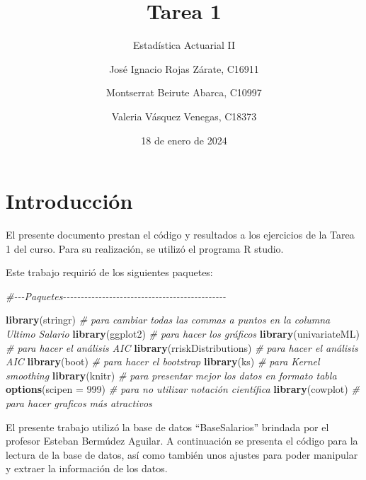 \documentclass[
]{article}
\title{Tarea 1}
\subtitle{Estadística Actuarial II}
\author{José Ignacio Rojas Zárate, C16911 \and Montserrat Beirute
Abarca, C10997 \and Valeria Vásquez Venegas, C18373}
\date{18 de enero de 2024}
\newenvironment{Shaded}{\begin{snugshade}}{\end{snugshade}}
\newcommand{\AttributeTok}[1]{\textcolor[rgb]{0.13,0.29,0.53}{#1}}
\newcommand{\CommentTok}[1]{\textcolor[rgb]{0.56,0.35,0.01}{\textit{#1}}}
\newcommand{\DecValTok}[1]{\textcolor[rgb]{0.00,0.00,0.81}{#1}}
\newcommand{\FunctionTok}[1]{\textcolor[rgb]{0.13,0.29,0.53}{\textbf{#1}}}
\newcommand{\NormalTok}[1]{#1}
\begin{document}
\maketitle

{
\setcounter{tocdepth}{2}
\tableofcontents
}
\newpage

\hypertarget{introducciuxf3n}{%
\section{Introducción}\label{introducciuxf3n}}

El presente documento prestan el código y resultados a los ejercicios de
la Tarea 1 del curso. Para su realización, se utilizó el programa R
studio.

Este trabajo requirió de los siguientes paquetes:

\begin{Shaded}
\begin{Highlighting}[]
\CommentTok{\#{-}{-}{-}Paquetes{-}{-}{-}{-}{-}{-}{-}{-}{-}{-}{-}{-}{-}{-}{-}{-}{-}{-}{-}{-}{-}{-}{-}{-}{-}{-}{-}{-}{-}{-}{-}{-}{-}{-}{-}{-}{-}{-}{-}{-}{-}{-}{-}{-}{-}{-}}

\FunctionTok{library}\NormalTok{(stringr) }\CommentTok{\# para cambiar todas las commas a puntos en la columna Ultimo Salario}
\FunctionTok{library}\NormalTok{(ggplot2) }\CommentTok{\# para hacer los gráficos}
\FunctionTok{library}\NormalTok{(univariateML) }\CommentTok{\# para hacer el análisis AIC}
\FunctionTok{library}\NormalTok{(rriskDistributions) }\CommentTok{\# para hacer el análisis AIC}
\FunctionTok{library}\NormalTok{(boot) }\CommentTok{\# para hacer el bootstrap}
\FunctionTok{library}\NormalTok{(ks) }\CommentTok{\# para Kernel smoothing}
\FunctionTok{library}\NormalTok{(knitr) }\CommentTok{\# para presentar mejor los datos en formato tabla}
\FunctionTok{options}\NormalTok{(}\AttributeTok{scipen =} \DecValTok{999}\NormalTok{) }\CommentTok{\# para no utilizar notación científica}
\FunctionTok{library}\NormalTok{(cowplot) }\CommentTok{\# para hacer graficos más atractivos}
\end{Highlighting}
\end{Shaded}

El presente trabajo utilizó la base de datos ``BaseSalarios'' brindada
por el profesor Esteban Bermúdez Aguilar. A continuación se presenta el
código para la lectura de la base de datos, así como también unos
ajustes para poder manipular y extraer la información de los datos.
\end{document}
